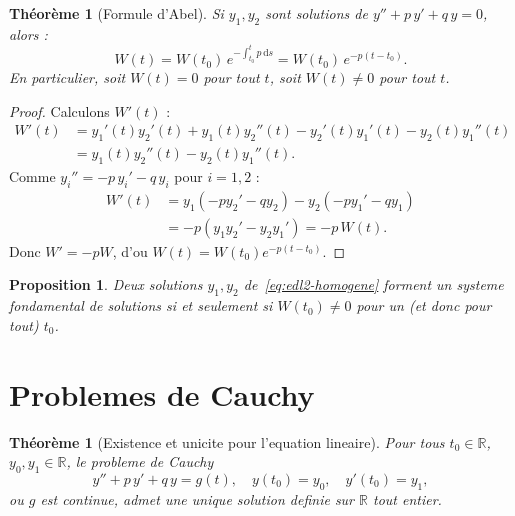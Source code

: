 \documentclass[12pt,a4paper,openany]{book}
\theoremstyle{definition}
\theoremstyle{plain}
\newtheorem{theoreme}[definition]{Théorème}
\newtheorem{proposition}[definition]{Proposition}
\theoremstyle{remark}
\newcommand{\R}{\mathbb{R}}
\newcommand{\dd}{\mathrm{d}}
\begin{document}
\begin{theoreme}[Formule d'Abel]\label{thm:abel}
Si $y_1, y_2$ sont solutions de $y'' + p\, y' + q\, y = 0$, alors :
\begin{equation}\label{eq:abel}
  W(t) = W(t_0)\, e^{-\int_{t_0}^{t} p\, \dd s} = W(t_0)\, e^{-p(t - t_0)}.
\end{equation}
En particulier, soit $W(t) = 0$ pour tout $t$, soit $W(t) \neq 0$ pour tout $t$.
\end{theoreme}

\begin{proof}
Calculons $W'(t)$ :
\begin{align*}
W'(t) &= y_1'(t)y_2'(t) + y_1(t)y_2''(t) - y_2'(t)y_1'(t) - y_2(t)y_1''(t) \\
  &= y_1(t)y_2''(t) - y_2(t)y_1''(t).
\end{align*}
Comme $y_i'' = -p\, y_i' - q\, y_i$ pour $i = 1, 2$ :
\begin{align*}
W'(t) &= y_1(-py_2' - qy_2) - y_2(-py_1' - qy_1) \\
  &= -p(y_1 y_2' - y_2 y_1') = -p\, W(t).
\end{align*}
Donc $W' = -pW$, d'ou $W(t) = W(t_0)e^{-p(t-t_0)}$.
\end{proof}

\begin{proposition}\label{prop:wronskien-indep}
Deux solutions $y_1, y_2$ de~\eqref{eq:edl2-homogene} forment un \emph{systeme fondamental de solutions} si et seulement si $W(t_0) \neq 0$ pour un (et donc pour tout) $t_0$.
\end{proposition}

\section{Problemes de Cauchy}\label{sec:problemes-cauchy-edl2}

\begin{theoreme}[Existence et unicite pour l'equation lineaire]\label{thm:existence-unicite-edl2}
Pour tous $t_0 \in \R$, $y_0, y_1 \in \R$, le probleme de Cauchy
\[
  y'' + p\, y' + q\, y = g(t), \quad y(t_0) = y_0, \quad y'(t_0) = y_1,
\]
ou $g$ est continue, admet une unique solution definie sur $\R$ tout entier.
\end{theoreme}
\end{document}
